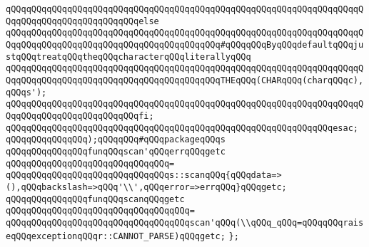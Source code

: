 \newline
\verb|qQQqqQQqqQQqqQQqqQQqqQQqqQQqqQQqqQQqqQQqqQQqqQQqqQQqqQQqqQQqqQQqqQQqqQQqqQQqqQQqqQQqqQQqqQQqqQQqelse|\newline
\verb|qQQqqQQqqQQqqQQqqQQqqQQqqQQqqQQqqQQqqQQqqQQqqQQqqQQqqQQqqQQqqQQqqQQqqQQqqQQqqQQqqQQqqQQqqQQqqQQqqQQqqQQqqQQqqQQq#qQQqqQQqByqQQqdefaultqQQqjustqQQqtreatqQQqtheqQQqcharacterqQQqliterallyqQQq|\newline
\verb|qQQqqQQqqQQqqQQqqQQqqQQqqQQqqQQqqQQqqQQqqQQqqQQqqQQqqQQqqQQqqQQqqQQqqQQqqQQqqQQqqQQqqQQqqQQqqQQqqQQqqQQqqQQqqQQqTHEqQQq(CHARqQQq(charqQQqc),qQQqs');|\newline
\verb|qQQqqQQqqQQqqQQqqQQqqQQqqQQqqQQqqQQqqQQqqQQqqQQqqQQqqQQqqQQqqQQqqQQqqQQqqQQqqQQqqQQqqQQqqQQqqQQqfi;|\newline
\verb|qQQqqQQqqQQqqQQqqQQqqQQqqQQqqQQqqQQqqQQqqQQqqQQqqQQqqQQqqQQqqQQqesac;|\newline
\verb|qQQqqQQqqQQqqQQq);qQQqqQQq#qQQqpackageqQQqs|\newline
\newline
\newline
\verb|qQQqqQQqqQQqqQQqfunqQQqscan'qQQqerrqQQqgetc|\newline
\verb|qQQqqQQqqQQqqQQqqQQqqQQqqQQqqQQq=|\newline
\verb|qQQqqQQqqQQqqQQqqQQqqQQqqQQqqQQqs::scanqQQq{qQQqdata=>(),qQQqbackslash=>qQQq'\\',qQQqerror=>errqQQq}qQQqgetc;|\newline
\newline
\verb|qQQqqQQqqQQqqQQqfunqQQqscanqQQqgetc|\newline
\verb|qQQqqQQqqQQqqQQqqQQqqQQqqQQqqQQqqQQq=|\newline
\verb|qQQqqQQqqQQqqQQqqQQqqQQqqQQqqQQqqQQqscan'qQQq(\\qQQq_qQQq=qQQqqQQqraiseqQQqexceptionqQQqr::CANNOT_PARSE)qQQqgetc;|\newline
\verb|};|\newline
\newline
\newline

